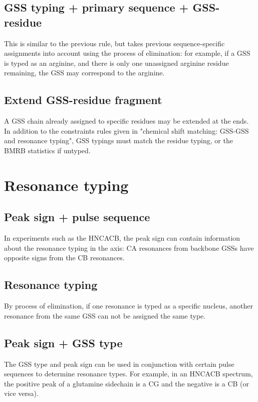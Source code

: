 \subsection*{GSS typing + primary sequence + GSS-residue}
This is similar to the previous rule, but takes previous sequence-specific
assignments into account using the process of elimination: for example, if a
GSS is typed as an arginine, and there is only one unassigned arginine residue 
remaining, the GSS may correspond to the arginine.

\subsection*{Extend GSS-residue fragment}
A GSS chain already assigned to specific residues may be extended at the ends.
In addition to the constraints rules given in 
"chemical shift matching: GSS-GSS and resonance typing",
GSS typings must match the residue typing, or the BMRB statistics if untyped.



\section*{Resonance typing}

\subsection*{Peak sign + pulse sequence}
In experiments such as the HNCACB, the peak sign can contain information 
about the resonance typing in the \nmrisoc{} axis: CA resonances from backbone
GSSs have opposite signs from the CB resonances.

\subsection*{Resonance typing}
By process of elimination, if one resonance is typed as a specific nucleus,
another resonance from the same GSS can not be assigned the same type.

\subsection*{Peak sign + GSS type}
The GSS type and peak sign can be used in conjunction with certain pulse 
sequences to determine resonance types.  For example, in an HNCACB spectrum, 
the positive peak of a glutamine sidechain is a CG and the negative is a CB 
(or vice versa).

